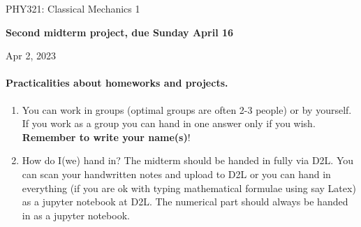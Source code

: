 \documentclass[%
oneside,                 %
final,                   %
10pt]{article}
\begin{document}

\newcommand{\exercisesection}[1]{\subsection*{#1}}






\thispagestyle{empty}

\begin{center}
{\LARGE\bf
\begin{spacing}{1.25}
PHY321: Classical Mechanics 1
\end{spacing}
}
\end{center}


\begin{center}
{\bf Second midterm project, due Sunday  April 16${}^{}$} \\ [0mm]
\end{center}

\begin{center}
\end{center}
    

\begin{center}
Apr 2, 2023
\end{center}

\vspace{1cm}


\paragraph{Practicalities about  homeworks and projects.}
\begin{enumerate}
\item You can work in groups (optimal groups are often 2-3 people) or by yourself. If you work as a group you can hand in one answer only if you wish. \textbf{Remember to write your name(s)}!

\item How do I(we)  hand in?  The midterm should be handed in fully via D2L. You can scan your handwritten notes and upload to D2L or you can hand in everything (if you are ok with typing mathematical formulae using say Latex) as a jupyter notebook at D2L. The numerical part should always be handed in as a jupyter notebook.
\end{enumerate}
\end{document}
